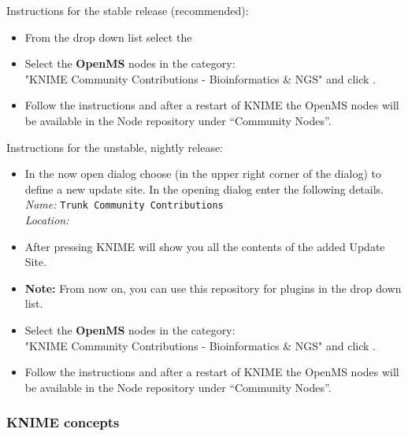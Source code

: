 {
Instructions for the stable release (recommended):
\begin{itemize}
  \item From the  drop down list select the \\ \menu{\KnimeTrustedSite}
  \item Select the \textbf{OpenMS} nodes in the category: \\ "KNIME Community Contributions - Bioinformatics \& NGS" and click .
  \item Follow the instructions and after a restart of KNIME the OpenMS nodes will be available in the Node repository under “Community Nodes”.
\end{itemize}

Instructions for the unstable, nightly release:
\begin{itemize}
  \item \label{it:add_site} In the now open dialog choose  (in the upper right corner of the dialog) to define a new update site. In the opening dialog enter the following details. \\
  \textit{Name:} \texttt{Trunk Community Contributions} \\
  \textit{Location:} \menu{\KnimeTrunkSite}
  \item \label{it:select_site} After pressing  KNIME will show you all the contents of the added Update Site.
  \item \textbf{Note:} From now on, you can use this repository for plugins in the  drop down list.
  \item Select the \textbf{OpenMS} nodes in the category: \\ "KNIME Community Contributions - Bioinformatics \& NGS" and click .
  \item Follow the instructions and after a restart of KNIME the OpenMS nodes will be available in the Node repository under “Community Nodes”.
\end{itemize}
}

\subsubsection{KNIME concepts}


